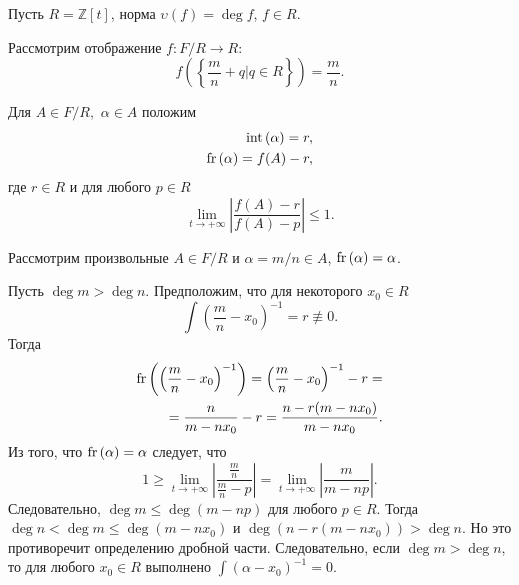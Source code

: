 \documentclass[_00_dissertation.tex]{subfiles}
\begin{document}
\begin{example}\label{example:Z[t]}
    Пусть $R = \mathbb{Z}[t]$, норма $\upsilon(f) = \deg f$, $f \in R$.

    Рассмотрим отображение $f: F/R \to R$:
    \begin{equation*}
        f\left(
            \left\{
                \frac{m}{n} + q \Big| q \in R
            \right\}
        \right) = \frac{m}{n}.
    \end{equation*}

    Для $A \in F/R,$ $\alpha \in A$ положим
    \begin{equation*}
        \begin{split}
            \textrm{int}\left(\alpha\right) = r,\\
            \textrm{fr}\left(\alpha\right) = f(A) - r,
        \end{split}
    \end{equation*}
    где $r \in R$ и для любого $p \in R$
    \begin{equation*}
        \lim_{t \to +\infty}\left|
            \frac{f(A) - r}{f(A) - p}
        \right| \le 1.
    \end{equation*}

    Рассмотрим произвольные $A \in F/R$ и $\alpha = m/n \in A$, $\textrm{fr}\left(\alpha\right) = \alpha$.

    Пусть $\deg m > \deg n$.
    Предположим, что для некоторого $x_0 \in R$
    \begin{equation*}
        \int{\left(
            \frac{m}{n} - x_0
        \right)^{-1}} = r \not\equiv 0.
    \end{equation*}
    Тогда
    \begin{equation*}
        \begin{split}
            \textrm{fr}\left(\left(
                \frac{m}{n} - x_0
            \right)^{-1}\right) = \left(
                \frac{m}{n} - x_0
            \right)^{-1} - r =\\
            = \frac{n}{m - n x_0} - r = \frac{n - r(m - n x_0)}{m - n x_0}.
        \end{split}
    \end{equation*}
    Из того, что $\textrm{fr}\left(\alpha\right) = \alpha$ следует, что
    \begin{equation*}
        1 \ge \lim_{t \to +\infty}\left|
            \frac{\frac{m}{n}}{\frac{m}{n} - p}
        \right| = \lim_{t \to +\infty}\left|
            \frac{m}{m - n p}
        \right|.
    \end{equation*}
    Следовательно, $\deg m \le \deg(m - n p)$ для любого $p \in R$.
    Тогда $\deg n < \deg m \le \deg(m - n x_0)$ и $\deg(n - r(m - n x_0)) > \deg n$.
    Но это противоречит определению дробной части.
    Следовательно, если $\deg m > \deg n$, то для любого $x_0 \in R$ выполнено $\int{(\alpha - x_{0})^{-1}} = 0$.


\end{example}
\end{document}
